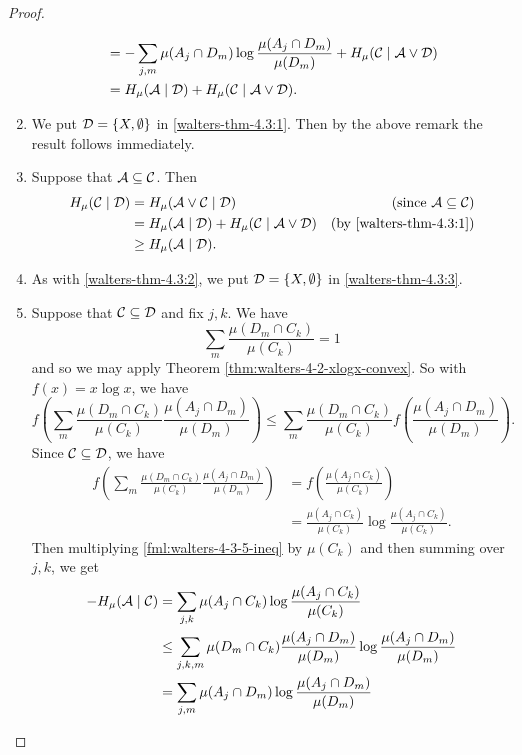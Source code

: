 \begin{theorem}
\begin{proof}
\begin{enumerate}
\begin{align*}
						&= -\sum_{j, m}{\mu(A_j \cap D_m) \log{\frac{\mu(A_j \cap D_m)}{\mu(D_m)}}} + H_\mu(\mathcal{C} \mid \mathcal{A} \vee \mathcal{D}) \\
						&= H_\mu(\mathcal{A} \mid \mathcal{D}) + H_\mu(\mathcal{C} \mid \mathcal{A} \vee \mathcal{D}).
				\end{align*}
			\item We put $\mathcal{D} = \{X, \emptyset\}$ in \ref{walters-thm-4.3:1}. Then by the above remark the result follows immediately.
			\item Suppose that $\mathcal{A} \subseteq \mathcal{C}$. Then
				\begin{align*}
					H_\mu(\mathcal{C} \mid \mathcal{D}) &= H_\mu(\mathcal{A} \vee \mathcal{C} \mid \mathcal{D}) & \text{(since } \mathcal{A} \subseteq \mathcal{C}) \\
						&= H_\mu(\mathcal{A} \mid \mathcal{D}) + H_\mu(\mathcal{C} \mid \mathcal{A} \vee \mathcal{D}) & \text{(by \ref{walters-thm-4.3:1})} \\
						&\geq H_\mu(\mathcal{A} \mid \mathcal{D}).
				\end{align*}
			\item As with \ref{walters-thm-4.3:2}, we put $\mathcal{D} = \{X, \emptyset\}$ in \ref{walters-thm-4.3:3}.
			\item Suppose that $\mathcal{C} \subseteq \mathcal{D}$ and fix $j, k$. We have
				\[
					\sum_{m}{\frac{\mu(D_m \cap C_k)}{\mu(C_k)}} = 1
				\]
				and so we may apply Theorem \ref{thm:walters-4-2-xlogx-convex}. So with $f(x) = x\log{x}$, we have
				\begin{equation} \label{fml:walters-4-3-5-ineq}
					f\left(\sum_{m}{\frac{\mu(D_m \cap C_k)}{\mu(C_k)} \frac{\mu(A_j \cap D_m)}{\mu(D_m)}}\right) \leq \sum_{m}{\frac{\mu(D_m \cap C_k)}{\mu(C_k)} f\left(\frac{\mu(A_j \cap D_m)}{\mu(D_m)}\right)}.
				\end{equation}
				Since $\mathcal{C} \subseteq \mathcal{D}$, we have
				\begin{align*}
					f\left(\sum_{m}{\frac{\mu(D_m \cap C_k)}{\mu(C_k)} \frac{\mu(A_j \cap D_m)}{\mu(D_m)}}\right) &= f\left(\frac{\mu(A_j \cap C_k)}{\mu(C_k)}\right) \\
						&= \frac{\mu(A_j \cap C_k)}{\mu(C_k)} \log{\frac{\mu(A_j \cap C_k)}{\mu(C_k)}}.
				\end{align*}
				Then multiplying \eqref{fml:walters-4-3-5-ineq} by $\mu(C_k)$ and then summing over $j, k$, we get
				\begin{align*}
					-H_\mu(\A \mid \C) &= \sum_{j, k}{\mu(A_j \cap C_k) \log{\frac{\mu(A_j \cap C_k)}{\mu(C_k)}}} \\
						&\leq \sum_{j, k, m}{\mu(D_m \cap C_k) \frac{\mu(A_j \cap D_m)}{\mu(D_m)} \log{\frac{\mu(A_j \cap D_m)}{\mu(D_m)}}} \\
						&= \sum_{j, m}{\mu(A_j \cap D_m) \log{\frac{\mu(A_j \cap D_m)}{\mu(D_m)}}} \\

\end{align*}
\end{enumerate}
\end{proof}
\end{theorem}

